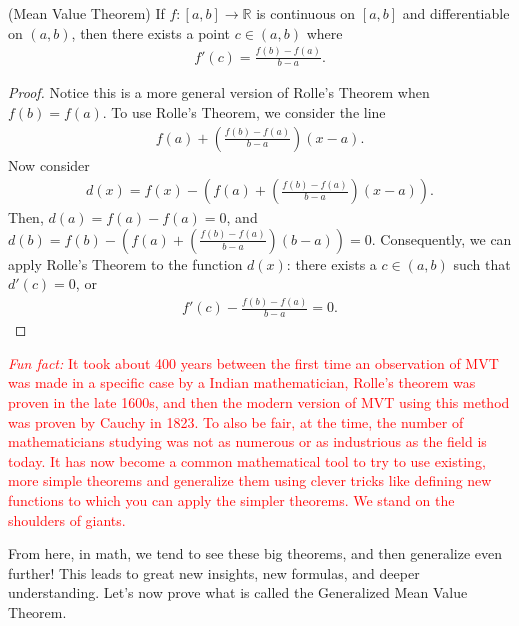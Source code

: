 \documentclass{ximera}
\begin{document}
\begin{theorem}{(Mean Value Theorem)}
    If $f:[a,b]\to \mathbb{R}$ is continuous on $[a,b]$ and differentiable on $(a,b)$, then there exists a point $c \in (a,b)$ where 
    \begin{align*}
        f'(c) = \frac{f(b) - f(a)}{b-a}.
    \end{align*}
\end{theorem}
\begin{proof}
    Notice this is a more general version of Rolle's Theorem when $f(b) = f(a)$.  To use Rolle's Theorem, we consider the line
    \begin{align*}
        f(a) + \left(\frac{f(b) - f(a)}{b-a} \right)(x-a).
    \end{align*}
    Now consider
    \begin{align*}
        d(x) = f(x) - \left(f(a) + \left(\frac{f(b) - f(a)}{b-a} \right)(x-a)\right).
    \end{align*}
    Then, $d(a) = f(a) - f(a) = 0$, and $d(b) = f(b) -\left(f(a) + \left(\frac{f(b) - f(a)}{b-a} \right)(b-a)\right) = 0$.
    Consequently, we can apply Rolle's Theorem to the function $d(x)$:
    there exists a $c \in (a,b)$ such that $d'(c) = 0$, or 
    \begin{align*}
        f'(c)  - \frac{f(b) - f(a)}{b-a} = 0.
    \end{align*}
\end{proof}

\textcolor{red}{\textit{Fun fact:} It took about 400 years between the first time an observation of MVT was made in a specific case by a Indian mathematician, Rolle's theorem was proven in the late 1600s, and then the modern version of MVT using this method was proven by Cauchy in 1823.  To also be fair, at the time, the number of mathematicians studying was not as numerous or as industrious as the field is today.  It has now become a common mathematical tool to try to use existing, more simple theorems and generalize them using clever tricks like defining new functions to which you can apply the simpler theorems.  We stand on the shoulders of giants.}

From here, in math, we tend to see these big theorems, and then generalize even further!  This leads to great new insights, new formulas, and deeper understanding.  Let's now prove what is called the Generalized Mean Value Theorem.
\end{document}
